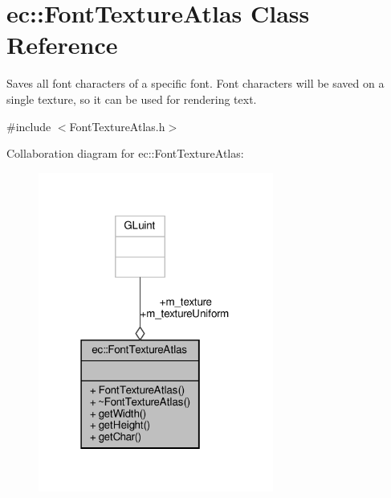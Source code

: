 \hypertarget{classec_1_1_font_texture_atlas}{}\section{ec\+:\+:Font\+Texture\+Atlas Class Reference}
\label{classec_1_1_font_texture_atlas}


Saves all font characters of a specific font. Font characters will be saved on a single texture, so it can be used for rendering text.  




{\ttfamily \#include $<$Font\+Texture\+Atlas.\+h$>$}



Collaboration diagram for ec\+:\+:Font\+Texture\+Atlas\+:\nopagebreak
\begin{figure}[H]
\begin{center}
\leavevmode
\includegraphics[width=219pt]{classec_1_1_font_texture_atlas__coll__graph}
\end{center}
\end{figure}
